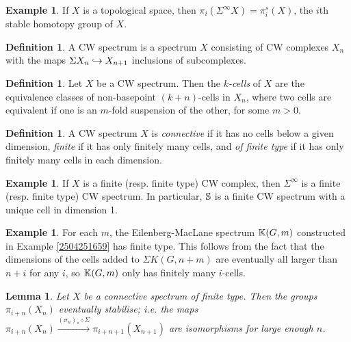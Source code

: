 \documentclass[11pt, titlepage]{article} %
\def\bb{\ensuremath\mathbb}
\def\inj{\ensuremath\hookrightarrow}
\numberwithin{equation}{subsection}
\theoremstyle{plain}
\newtheorem{lemma}[theorem]{Lemma}
\theoremstyle{definition}
\newtheorem{definition}[theorem]{Definition}
\newtheorem{example}[theorem]{Example}
\begin{document}
\begin{example}
If \(X\) is a topological space, then \(\pi_i(\Sigma^\infty X)=\pi_i^s(X)\), the \(i\)th stable homotopy group of \(X\). 
\end{example}

\begin{definition}
A CW spectrum is a spectrum \(X\) consisting of CW complexes \(X_n\) with the maps \(\Sigma X_n \inj X_{n+1}\) inclusions of subcomplexes. 
\end{definition}

\begin{definition}
Let \(X\) be a CW spectrum. Then the \textit{\(k\)-cells} of \(X\) are the equivalence classes of non-basepoint \((k+n)\)-cells in \(X_n\), where two cells are equivalent if one is an \(m\)-fold suspension of the other, for some \(m>0\). 
\end{definition}


\begin{definition}
A CW spectrum \(X\) is \textit{connective} if it has no cells below a given dimension, \textit{finite} if it has only finitely many cells, and \textit{of finite type} if it has only finitely many cells in each dimension.
\end{definition}

\begin{example}
If \(X\) is a finite (resp. finite type) CW complex, then \(\Sigma^\infty\) is a finite (resp. finite type) CW spectrum. In particular, \(\bb{S}\) is a finite CW spectrum with a unique cell in dimension 1.
\end{example}

\begin{example}\label{2504251704}
For each \(m\), the Eilenberg-MacLane spectrum \(\bb{K}(G, m)\) constructed in Example \ref{2504251659} has finite type. This follows from the fact that the dimensions of the cells added to \(\Sigma K(G,n+m)\) are eventually all larger than \(n+i\) for any \(i\), so \(\bb{K}(G, m)\) only has finitely many \(i\)-cells. 
\end{example}

\begin{lemma}\label{2504151105}
Let \(X\) be a connective spectrum of finite type. Then the groups \(\pi_{i+n}(X_n)\) eventually stabilise; i.e. the maps \(\pi_{i+n}(X_n) \xrightarrow{(\sigma_n)_*\circ \Sigma} \pi_{i+n+1}(X_{n+1})\) are isomorphisms for large enough \(n\). 
\end{lemma}
\end{document}
